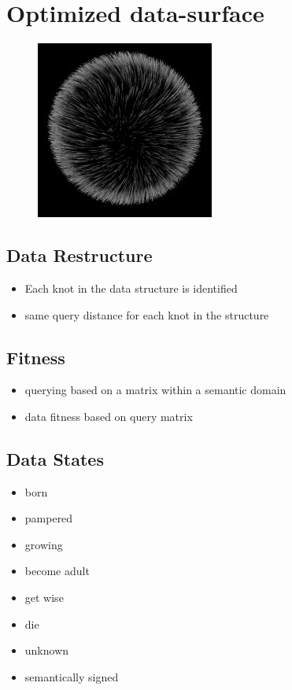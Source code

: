 \documentclass[11pt]{article}
\begin{document}
\section{Optimized data-surface}
\begin{figure}[htp]
\centering
\includegraphics[scale=0.59]{./image/query-surface.jpg}
\end{figure}
\subsection{Data Restructure}

\begin{itemize}
\item Each knot in the data structure is identified
\item same query distance for each knot in the structure
\end{itemize}
\subsection{Fitness}


\begin{itemize}
\item querying based on a matrix within a semantic domain
\item data fitness based on query matrix


\end{itemize}

\subsection{Data States}

\begin{itemize} 
\label{item any mix of states}
\item born \item pampered  \item growing 
\item become adult \item get wise \item die
\item unknown
\item semantically signed
\end{itemize}
\end{document}
